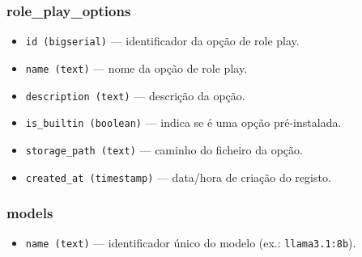 \subsubsection{role\_play\_options}
\begin{itemize}
  \item \texttt{id (bigserial)} — identificador da opção de role play.
  \item \texttt{name (text)} — nome da opção de role play.
  \item \texttt{description (text)} — descrição da opção.
  \item \texttt{is\_builtin (boolean)} — indica se é uma opção pré-instalada.
  \item \texttt{storage\_path (text)} — caminho do ficheiro da opção.
  \item \texttt{created\_at (timestamp)} — data/hora de criação do registo.
\end{itemize}

\subsubsection{models}
\begin{itemize}
  \item \texttt{name (text)} — identificador único do modelo (ex.: \texttt{llama3.1:8b}).
\end{itemize}

